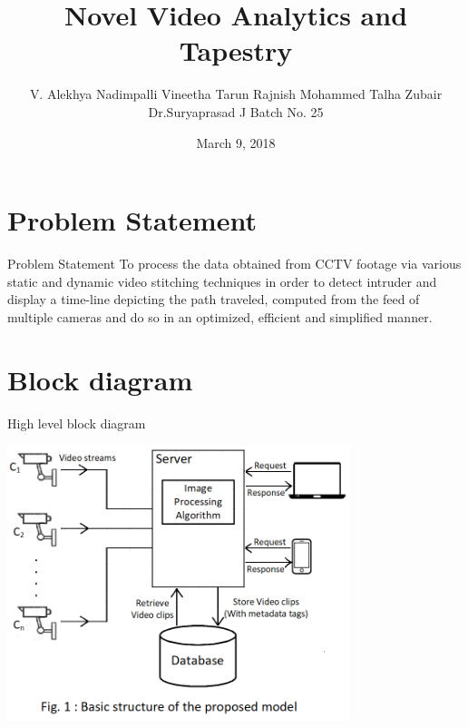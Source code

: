 \documentclass{beamer}
\title[ProjectReview2]{Novel Video Analytics and Tapestry}
\author[]{
  V. Alekhya
\newline
  Nadimpalli Vineetha
\newline
  Tarun Rajnish
\newline	
  Mohammed Talha Zubair
\newline
\newline
\small{
  Dr.Suryaprasad J
\newline  Batch No. 25}}
\institute[25]{}
\date[March 9, 2018]{March 9, 2018}
\begin{document}

\begin{frame}
  \titlepage 
\end{frame}


\section{Problem Statement}
\begin{frame}{Problem Statement}
To process the data obtained from CCTV footage via various static and dynamic video stitching techniques in order to detect intruder and display a time-line depicting the path traveled, computed from the feed of multiple cameras and do so in an optimized, efficient and simplified manner.
\end{frame}


\section{Block diagram}
\begin{frame}{High level block diagram}
  \begin{center}
    \includegraphics[width=10cm,keepaspectratio]{HighLevelBlockDiagram.png}
  \end{center}
\end{frame}

\end{document}
